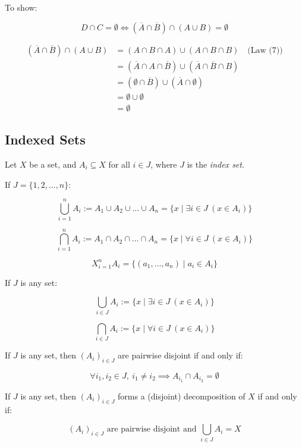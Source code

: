 To show:

\[
	D \cap C = \emptyset \iff (\overline{A} \cap \overline{B}) \cap (A \cup B) = \emptyset
\]

\begin{align*}
	(\overline{A} \cap \overline{B}) \cap (A \cup B)
	 & = (A \cap B \cap A) \cup (A \cap B \cap B) \quad \text{(Law (7))}                      \\
	 & = (\overline{A} \cap A \cap \overline{B}) \cup (\overline{A} \cap \overline{B} \cap B) \\
	 & = (\emptyset \cap \overline{B}) \cup (\overline{A} \cap \emptyset)                     \\
	 & = \emptyset \cup \emptyset                                                             \\
	 & = \emptyset
\end{align*}
\QED

\subsection{Indexed Sets}

Let \( X \) be a set, and \( A_i \subseteq X \) for all \( i \in J \), where \( J \) is the \emph{index set}.
\vspace{\baselineskip}

If \( J = \{1, 2, \dots, n\} \):

\[
	\bigcup_{i=1}^{n} A_i := A_1 \cup A_2 \cup \dots \cup A_n = \{ x \mid \exists i \in J \ (x \in A_i) \}
\]

\[
	\bigcap_{i=1}^{n} A_i := A_1 \cap A_2 \cap \dots \cap A_n = \{ x \mid \forall i \in J \ (x \in A_i) \}
\]

\[
	X_{i=1}^{n} A_i = \{(a_1, \dots, a_n) \mid a_i \in A_i \}
\]

If \( J \) is any set:

\[
	\bigcup_{i \in J} A_i := \{ x \mid \exists i \in J \ (x \in A_i) \}
\]

\[
	\bigcap_{i \in J} A_i := \{ x \mid \forall i \in J \ (x \in A_i) \}
\]

If \( J \) is any set, then \( {(A_i)}_{i \in J} \) are pairwise disjoint if and only if:

\[
	\forall i_1, i_2 \in J, \ i_1 \neq i_2 \implies A_{i_1} \cap A_{i_2} = \emptyset
\]

If \( J \) is any set, then \( {(A_i)}_{i \in J} \) forms a (disjoint) decomposition of \( X \) if and only if:

\[
	{(A_i)}_{i \in J} \text{ are pairwise disjoint and } \bigcup_{i \in J} A_i = X
\]

